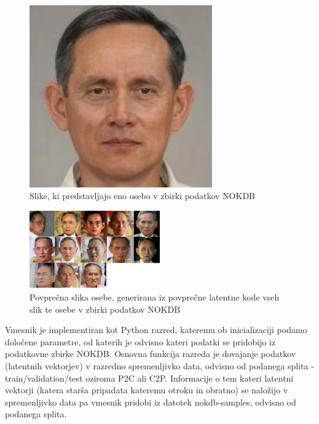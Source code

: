 \documentclass[a4paper,12pt,openright]{book}
\begin{document}
\begin{figure}[htb]
\begin{center}
  \includegraphics[width=0.7\textwidth]{images/mean_before.png}
\end{center}
  \caption{Slike, ki predstavljajo eno osebo v zbirki podatkov NOKDB}
  \label{Slike, ki predstavljajo eno osebo v zbirki podatkov NOKDB}
\end{figure}


\begin{figure}[htb]
\begin{center}
  \includegraphics[width=0.5\textwidth]{images/mean_after.png}
\end{center}
  \caption{Povprečna slika osebe, generirana iz povprečne latentne kode vseh slik te osebe v zbirki podatkov NOKDB}
  \label{Povprečna slika osebe, generirana iz povprečne latentne kode vseh slik te osebe v zbirki podatkov NOKDB}
\end{figure}

Vmesnik je implementiran kot Python razred, kateremu ob inicializaciji podamo določene parametre, od katerih je odvisno kateri podatki se pridobijo iz podatkovne zbirke NOKDB. Osnovna funkcija razreda je dovajanje podatkov (latentnih vektorjev) v razredno spremenljivko data, odvisno od podanega splita - train/validation/test oziroma P2C ali C2P. Informacije o tem kateri latentni vektorji (katera starša pripadata kateremu otroku in obratno) se naložijo v spremenljivko data pa vmesnik pridobi iz datotek nokdb-samples, odvisno od podanega splita.
 
\end{document}
